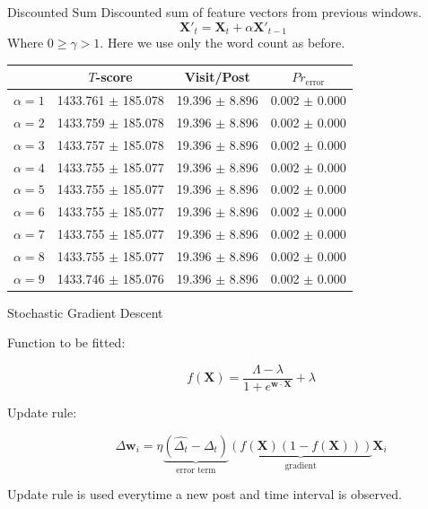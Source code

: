 \documentclass[12pt]{../presentation}
\newcommand{\dt}{\Delta_t}
\newcommand{\weights}{\mathbf{w}}
\newcommand{\X}{\mathbf{X}}
\begin{document}
\begin{frame}{Discounted Sum}
	Discounted sum of feature vectors from previous windows.
\[
	\X'_t = \X_t + \alpha \X'_{t-1}
\]
Where $0 \geq \gamma > 1$. Here we use only the word count as before.
	\begin{center}
		\footnotesize
		\begin{tabular}{ | l | c | c | c | }
			\hline
						&	        $T$-score &	       		Visit/Post	  & $Pr_{\text{error}}$\\
			\hline
		  $\alpha=1$ &	1433.761 $\pm$ 185.078 &   	19.396 $\pm$ 8.896 &  	0.002 $\pm$ 0.000 \\
          $\alpha=2$ &	1433.759 $\pm$ 185.078 &   	19.396 $\pm$ 8.896 &  	0.002 $\pm$ 0.000 \\
          $\alpha=3$ &	1433.757 $\pm$ 185.078 &   	19.396 $\pm$ 8.896 &  	0.002 $\pm$ 0.000 \\
          $\alpha=4$ &	1433.755 $\pm$ 185.077 &   	19.396 $\pm$ 8.896 &  	0.002 $\pm$ 0.000 \\
          $\alpha=5$ &	1433.755 $\pm$ 185.077 &   	19.396 $\pm$ 8.896 &  	0.002 $\pm$ 0.000 \\
          $\alpha=6$ &	1433.755 $\pm$ 185.077 &   	19.396 $\pm$ 8.896 &  	0.002 $\pm$ 0.000 \\
          $\alpha=7$ &	1433.755 $\pm$ 185.077 &   	19.396 $\pm$ 8.896 &  	0.002 $\pm$ 0.000 \\
          $\alpha=8$ &	1433.755 $\pm$ 185.077 &   	19.396 $\pm$ 8.896 &  	0.002 $\pm$ 0.000 \\
          $\alpha=9$ &	1433.746 $\pm$ 185.076 &   	19.396 $\pm$ 8.896 &  	0.002 $\pm$ 0.000 \\			
			\hline
		\end{tabular}
	\end{center}
\end{frame}
\begin{frame}{Stochastic Gradient Descent}
\begin{description}
	\item[Function to be fitted:]
\[
	f(\X) = \frac{\Lambda-\lambda}{1 + e^{\weights \cdot \X}} + \lambda
\]
\item[Update rule:]
\[
	\Delta \weights_i = \eta
				\underbrace{\left(\widehat{\dt} - \dt \right)}_{\text{error term}}
				\underbrace{\left( f(\X)(1-f(\X)) \right)}_{\text{gradient}}
						\X_i
\]
\end{description}
Update rule is used everytime a new post and time interval is observed.
\end{frame}
\end{document}
